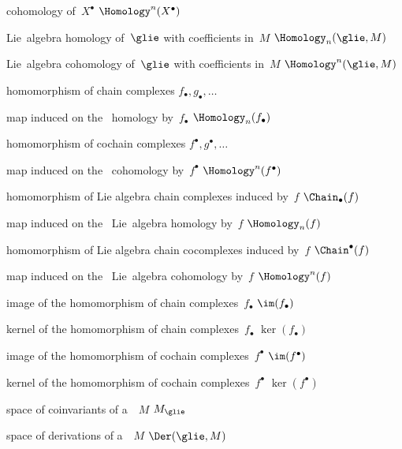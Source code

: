{ cohomology of~$X^\bullet$}
{$\Homology^n(X^\bullet)$}

{ Lie~algebra homology of~$\glie$ with coefficients in~$M$}
{$\Homology_n(\glie, M)$}

{ Lie~algebra cohomology of~$\glie$ with coefficients in~$M$}
{$\Homology^n(\glie, M)$}

{homomorphism of chain complexes}
{$f_\bullet, g_\bullet, \dotsc$}

{map induced on the~ homology by~$f_\bullet$}
{$\Homology_n(f_\bullet)$}

{homomorphism of cochain complexes}
{$f^\bullet, g^\bullet, \dotsc$}

{map induced on the~ cohomology by~$f^\bullet$}
{$\Homology^n(f^\bullet)$}

{homomorphism of Lie algebra chain complexes induced by~$f$}
{$\Chain_\bullet(f)$}

{map induced on the~ Lie~algebra homology by~$f$}
{$\Homology_n(f)$}

{homomorphism of Lie algebra chain cocomplexes induced by~$f$}
{$\Chain^\bullet(f)$}

{map induced on the~ Lie~algebra cohomology by~$f$}
{$\Homology^n(f)$}

{image of the homomorphism of chain complexes~$f_\bullet$}
{$\im(f_\bullet)$}

{kernel of the homomorphism of chain complexes~$f_\bullet$}
{$\ker(f_\bullet)$}

{image of the homomorphism of cochain complexes~$f^\bullet$}
{$\im(f^\bullet)$}

{kernel of the homomorphism of cochain complexes~$f^\bullet$}
{$\ker(f^\bullet)$}

{space of coinvariants of a~\representation{$\glie$}~$M$}
{$M_{\glie}$}

{space of derivations of a~\representation{$\glie$}~$M$}
{$\Der(\glie, M)$}

